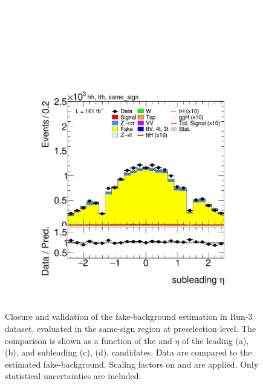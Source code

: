 \begin{figure}[htbp]
\begin{subfigure}[b]{0.45\textwidth}
      \includegraphics[width=\textwidth]{images/fakes_run3/plot_tau_1_eta_hh_tth_22_23_24_same_sign.pdf}
      \caption{}
    \end{subfigure}
  
    \caption{
      Closure and validation of the fake-\tauhad background estimation in Run-3 dataset, evaluated in the same-sign region at preselection level.
      The comparison is shown as a function of the \pt and $\eta$ of the leading (a), (b), and subleading (c), (d), \tauhad candidates. 
      Data are compared to the estimated fake-\tauhad background. Scaling factors on \ztautau and \ttbar are applied. Only statistical uncertainties are included.
    }
    \label{fig:closure_validation_run3}
  \end{figure}

